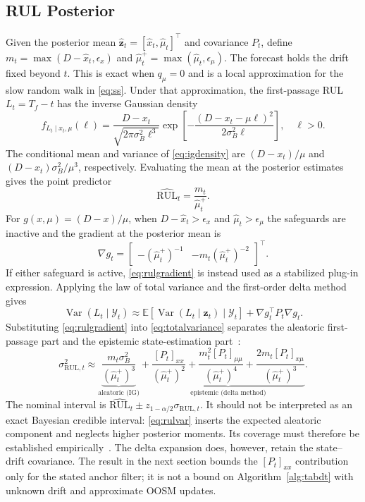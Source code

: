 \documentclass[journal]{IEEEtran}
\newcommand{\E}{\mathbb{E}}
\newcommand{\rul}{\mathrm{RUL}}
\begin{document}
\subsection{RUL Posterior}
Given the posterior mean
$\hat{\mathbf z}_t=[\hat x_t,\hat\mu_t]^{\top}$ and covariance $P_t$, define
$m_t=\max(D-\hat x_t,\epsilon_x)$ and
$\hat\mu_t^+=\max(\hat\mu_t,\epsilon_\mu)$. The forecast holds the drift fixed
beyond $t$. This is exact when $q_\mu=0$ and is a local approximation for the
slow random walk in \eqref{eq:ss}. Under that approximation, the first-passage RUL
$L_t=T_f-t$ has the inverse Gaussian density
\begin{equation}\label{eq:igdensity}
f_{L_t\mid x_t,\mu}(\ell)
=\frac{D-x_t}{\sqrt{2\pi\sigma_B^2\ell^3}}
\exp\!\left[-\frac{(D-x_t-\mu\ell)^2}
{2\sigma_B^2\ell}\right],\quad \ell>0.
\end{equation}
The conditional mean and variance of \eqref{eq:igdensity} are
$(D-x_t)/\mu$ and $(D-x_t)\sigma_B^2/\mu^3$, respectively. Evaluating the
mean at the posterior estimates gives the point predictor
\begin{equation}\label{eq:rulmean}
\widehat{\rul}_t=\frac{m_t}{\hat\mu_t^+}.
\end{equation}
For $g(x,\mu)=(D-x)/\mu$, when $D-\hat x_t>\epsilon_x$ and
$\hat\mu_t>\epsilon_\mu$ the safeguards are inactive and the gradient at the
posterior mean is
\begin{equation}\label{eq:rulgradient}
\nabla g_t=
\begin{bmatrix}-(\hat\mu_t^+)^{-1}&
-m_t(\hat\mu_t^+)^{-2}\end{bmatrix}^{\!\top}.
\end{equation}
If either safeguard is active, \eqref{eq:rulgradient} is instead used as a
stabilized plug-in expression.
Applying the law of total variance and the first-order delta method gives
\begin{equation}\label{eq:totalvariance}
\operatorname{Var}(L_t\mid\mathcal Y_t)
\approx \E[\operatorname{Var}(L_t\mid\mathbf z_t)\mid\mathcal Y_t]
+\nabla g_t^\top P_t\nabla g_t.
\end{equation}
Substituting \eqref{eq:rulgradient} into \eqref{eq:totalvariance} separates
the aleatoric first-passage part and the epistemic
state-estimation part~\cite{si2014}:
\begin{equation}\label{eq:rulvar}
\sigma_{\rul,t}^{2}
\approx\underbrace{\frac{m_t\sigma_B^{2}}{(\hat\mu_t^+)^{3}}}_{\text{aleatoric (IG)}}
+\underbrace{\frac{[P_t]_{xx}}{(\hat\mu_t^+)^{2}}
+\frac{m_t^2[P_t]_{\mu\mu}}{(\hat\mu_t^+)^{4}}
+\frac{2m_t[P_t]_{x\mu}}{(\hat\mu_t^+)^{3}}}_{\text{epistemic (delta method)}} .
\end{equation}
The nominal interval is
$\widehat{\rul}_t\pm z_{1-\alpha/2}\sigma_{\rul,t}$. It should not be
interpreted as an exact Bayesian credible interval: \eqref{eq:rulvar} inserts
the expected aleatoric component and neglects higher posterior moments. Its
coverage must therefore be established empirically~\cite{ding2024tim}. The
delta expansion does, however, retain the state--drift covariance. The result
in the next section bounds the $[P_t]_{xx}$ contribution only for the stated
anchor filter; it is not a bound on Algorithm~\ref{alg:tabdt} with unknown
drift and approximate OOSM updates.
\end{document}
